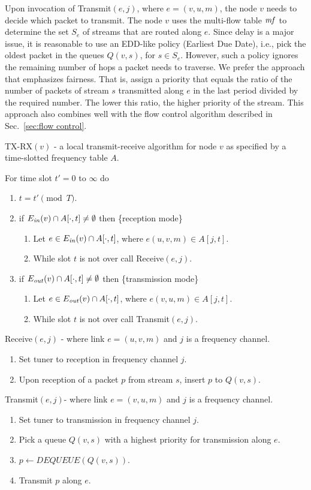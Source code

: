 \documentclass[11pt]{article}
\newenvironment{proof sketch}[1]{\noindent {\emph{Proof sketch of #1:}}}{\hfill \qed}
\newcommand{\mf}{\text{\emph{mf}}}
\newcommand{\Ein}{E_{\text{\emph{in}}}}
\newcommand{\Eout}{E_{\text{\emph{out}}}}
\begin{document}
Upon invocation of Transmit$(e,j)$, where $e=(v,u,m)$, the node $v$
needs to decide which packet to transmit. The node $v$ uses the
multi-flow table $\mf$ to determine the set $S_e$ of streams that are
routed along $e$.  Since delay is a major issue, it is reasonable to
use an EDD-like policy (Earliest Due Date), i.e., pick the oldest
packet in the queues $Q(v,s)$, for $s\in S_e$.  However, such a policy
ignores the remaining number of hops a packet needs to traverse. We
prefer the approach that emphasizes fairness. That is, assign a
priority that equals the ratio of the number of packets of stream $s$
transmitted along $e$ in the last period divided by the required
number. The lower this ratio, the higher priority of the stream. This
approach also combines well with the flow control algorithm described
in Sec.~\ref{sec:flow control}.


\begin{algorithm}[H]
  \caption{TX-RX$(v)$ - a local transmit-receive algorithm for node
    $v$ as specified by a time-slotted frequency table $A$.}
  \label{alg:tx-rx}
  For time slot $t'=0$ to $\infty$ do
  \begin{enumerate}%
  \item $t = t' \pmod T$.
  \item if $\Ein(v)\cap A[\cdot,t ]\neq \emptyset$ then \{reception
    mode\}
    \begin{enumerate}%
    \item Let $e\in \Ein(v)\cap A[\cdot,t]$, where $e(u,v,m)\in
      A[j,t]$.
    \item While slot $t$ is not over call Receive$(e,j)$.
    \end{enumerate}%
  \item if $\Eout(v)\cap A[\cdot,t ]\neq \emptyset$ then
    \{transmission mode\}
    \begin{enumerate}%
    \item Let $e\in \Eout(v)\cap A[\cdot,t ]$, where $e(v,u,m)\in
      A[j,t]$.
    \item While slot $t$ is not over call Transmit$(e,j)$.
    \end{enumerate}%
  \end{enumerate}%
  Receive$(e,j)$ - where link $e=(u,v,m)$ and $j$ is a frequency
  channel.
  \begin{enumerate}
  \item Set tuner to reception in frequency channel $j$.
  \item Upon reception of a packet $p$ from stream $s$, insert $p$ to
    $Q(v,s)$.
  \end{enumerate}

  Transmit$(e,j)$- where link $e=(v,u,m)$ and $j$ is a frequency
  channel.
  \begin{enumerate}
  \item Set tuner to transmission in frequency channel $j$.
  \item\label{line:priority} Pick a queue $Q(v,s)$ with a highest
    priority for transmission along $e$.
  \item $p \gets DEQUEUE(Q(v,s))$.
  \item Transmit $p$ along $e$.
  \end{enumerate}
\end{algorithm}
\end{document}
